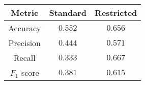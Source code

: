 \begin{tabular}{ccc}
    \textbf{Metric}  & \textbf{Standard} & \textbf{Restricted} \\\hline
    Accuracy         & $0.552$           & $0.656$                \\
    Precision        & $0.444$           & $0.571$                \\
    Recall           & $0.333$           & $0.667$                \\
    $F_1$ score      & $0.381$           & $0.615$
\end{tabular}
